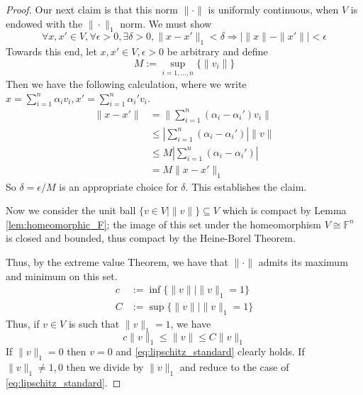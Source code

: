 \documentclass[12pt]{article}
\theoremstyle{plain}
\theoremstyle{definition}
\newcommand{\bb}[1]{\mathbb{#1}}
\begin{document}
\begin{proof}
		Our next claim is that this norm $\| \cdot \|$ is uniformly continuous, when $V$ is endowed with the $\| \cdot \|_1$ norm. We must show
		\begin{equation}
			\forall x, x' \in V, \forall \epsilon > 0, \exists \delta > 0, \| x - x' \|_1 < \delta \Longrightarrow | \| x \| - \| x' \| | < \epsilon
			\end{equation}
		Towards this end, let $x,x' \in V, \epsilon > 0$ be arbitrary and define
		\begin{equation}
			M := \operatorname{sup}_{i = 1,..., n}\{ \| v_i \| \}
			\end{equation}
		Then we have the following calculation, where we write $x = \sum_{i = 1}^n \alpha_i v_i, x' = \sum_{i = 1}^n \alpha_i' v_i$.
		\begin{align*}
			\| x - x' \| &= \| \sum_{i = 1}^n(\alpha_i - \alpha_i')v_i \|\\
			&\leq | \sum_{i = 1}^n(\alpha_i - \alpha_i') | \| v \|\\
			&\leq M | \sum_{i = 1}^n(\alpha_i - \alpha_i') |\\
			& = M \| x - x' \|_1
			\end{align*}
		So $\delta = \epsilon/M$ is an appropriate choice for $\delta$. This establishes the claim.
		
		Now we consider the unit ball $\{ v \in V \mid \| v \| \} \subseteq V$ which is compact by Lemma \ref{lem:homeomorphic_F}; the image of this set under the homeomorphism $V \cong \bb{F}^n$ is closed and bounded, thus compact by the Heine-Borel Theorem.
		
		Thus, by the extreme value Theorem, we have that $\| \cdot \|$ admits its maximum and minimum on this set.
		\begin{align*}
			c &:= \operatorname{inf}\{ \| v \| \mid  \| v \|_1 = 1\}\\
			C &:= \operatorname{sup}\{ \| v \| \mid \| v \|_1 = 1 \}
			\end{align*}
		Thus, if $v \in V$ is such that $\| v \|_1 = 1$, we have
		\begin{equation}\label{eq:lipschitz_standard}
			c\| v \|_1 \leq \| v \| \leq C\| v \|_1
			\end{equation}
		If $\| v \|_1 = 0$ then $v = 0$ and \eqref{eq:lipschitz_standard} clearly holds. If $\| v \|_1 \neq 1, 0$ then we divide by $\| v \|_1$ and reduce to the case of \eqref{eq:lipschitz_standard}.
		\end{proof}
	
	
	
	
\end{document}
